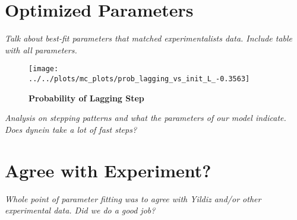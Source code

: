 \section{Optimized Parameters}
\textit{Talk about best-fit parameters that matched experimentalists data. Include table with all parameters.}




\begin{figure}[H]
	\centering
	\texttt{[image: ../../plots/mc\_plots/prob\_lagging\_vs\_init\_L\_-0.3563]}
	\caption[Probability of Lagging Step]{\textbf{Probability of Lagging Step}}
	\label{fig:step_length}
\end{figure}

\textit{Analysis on stepping patterns and what the parameters of our model indicate. Does dynein take a lot of fast steps?}

\section{Agree with Experiment?}
\textit{Whole point of parameter fitting was to agree with Yildiz and/or other experimental data. Did we do a good job?}